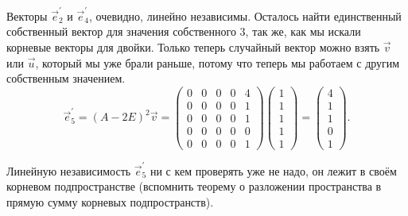 \begin{solution}
	Векторы $\vec{e}^\prime_2$ и $\vec{e}^\prime_4$, очевидно, линейно независимы. Осталось найти единственный собственный вектор для значения собственного $3$, так же, как мы искали корневые векторы для двойки. Только теперь случайный вектор можно взять $\vec{v}$ или $\vec{u}$, который мы уже брали раньше, потому что теперь мы работаем с другим собственным значением.
	\[
		\vec{e}^\prime_5 = (A - 2E)^2\vec{v} =
		\begin{pmatrix}
			0 & 0 & 0 & 0 & 4\\
			0 & 0 & 0 & 0 & 1\\
			0 & 0 & 0 & 0 & 1\\
			0 & 0 & 0 & 0 & 0\\
			0 & 0 & 0 & 0 & 1
		\end{pmatrix}
		\begin{pmatrix}
			1\\
			1\\
			1\\
			1\\
			1
		\end{pmatrix} =
		\begin{pmatrix}
			4\\
			1\\
			1\\
			0\\
			1
		\end{pmatrix}.
	\]

	Линейную независимость $\vec{e}^\prime_5$ ни с кем проверять уже не надо, он лежит в своём корневом подпространстве (вспомнить теорему о разложении пространства в прямую сумму корневых подпространств).
\end{solution}

